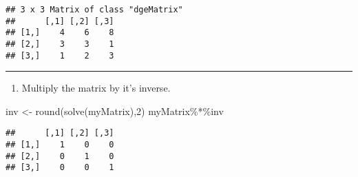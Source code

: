 \documentclass[
]{article}
\newenvironment{Shaded}{\begin{snugshade}}{\end{snugshade}}
\newcommand{\DecValTok}[1]{\textcolor[rgb]{0.00,0.00,0.81}{#1}}
\newcommand{\FunctionTok}[1]{\textcolor[rgb]{0.00,0.00,0.00}{#1}}
\newcommand{\NormalTok}[1]{#1}
\newcommand{\OtherTok}[1]{\textcolor[rgb]{0.56,0.35,0.01}{#1}}
\newcommand{\SpecialCharTok}[1]{\textcolor[rgb]{0.00,0.00,0.00}{#1}}
\providecommand{\tightlist}{%
  \setlength{\itemsep}{0pt}\setlength{\parskip}{0pt}}
\begin{document}
\begin{verbatim}
## 3 x 3 Matrix of class "dgeMatrix"
##      [,1] [,2] [,3]
## [1,]    4    6    8
## [2,]    3    3    1
## [3,]    1    2    3
\end{verbatim}

\begin{center}\rule{0.5\linewidth}{0.5pt}\end{center}

\begin{enumerate}
\def\labelenumi{\arabic{enumi}.}
\setcounter{enumi}{11}
\tightlist
\item
  Multiply the matrix by it's inverse.
\end{enumerate}

\begin{Shaded}
\begin{Highlighting}[]
\NormalTok{inv }\OtherTok{\textless{}{-}} \FunctionTok{round}\NormalTok{(}\FunctionTok{solve}\NormalTok{(myMatrix),}\DecValTok{2}\NormalTok{)}
\NormalTok{myMatrix}\SpecialCharTok{\%*\%}\NormalTok{inv}
\end{Highlighting}
\end{Shaded}

\begin{verbatim}
##      [,1] [,2] [,3]
## [1,]    1    0    0
## [2,]    0    1    0
## [3,]    0    0    1
\end{verbatim}
\end{document}
